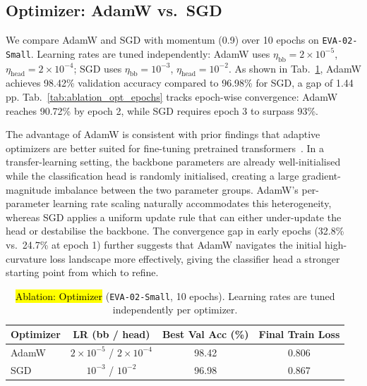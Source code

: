 \subsection{Optimizer: AdamW vs.\ SGD}

We compare AdamW and SGD with momentum (0.9) over 10 epochs on \texttt{EVA-02-Small}. Learning rates are tuned independently: AdamW uses $\eta_{\text{bb}}{=}2{\times}10^{-5}$, $\eta_{\text{head}}{=}2{\times}10^{-4}$; SGD uses $\eta_{\text{bb}}{=}10^{-3}$, $\eta_{\text{head}}{=}10^{-2}$. As shown in Tab.~\ref{tab:ablation_opt}, AdamW achieves 98.42\% validation accuracy compared to 96.98\% for SGD, a gap of 1.44\,pp. Tab.~\ref{tab:ablation_opt_epochs} tracks epoch-wise convergence: AdamW reaches 90.72\% by epoch 2, while SGD requires epoch 3 to surpass 93\%.

The advantage of AdamW is consistent with prior findings that adaptive optimizers are better suited for fine-tuning pretrained transformers~\citep{loshchilov2017decoupled}. In a transfer-learning setting, the backbone parameters are already well-initialised while the classification head is randomly initialised, creating a large gradient-magnitude imbalance between the two parameter groups. AdamW's per-parameter learning rate scaling naturally accommodates this heterogeneity, whereas SGD applies a uniform update rule that can either under-update the head or destabilise the backbone. The convergence gap in early epochs (32.8\% vs.\ 24.7\% at epoch 1) further suggests that AdamW navigates the initial high-curvature loss landscape more effectively, giving the classifier head a stronger starting point from which to refine.

\begin{table}[t]
\centering
\caption{\hl{Ablation: Optimizer} (\texttt{EVA-02-Small}, 10 epochs). Learning rates are tuned independently per optimizer.}
\label{tab:ablation_opt}
\footnotesize
\setlength{\tabcolsep}{4pt}
\begin{tabular}{lccc}
\toprule
Optimizer & LR (bb / head) & Best Val Acc (\%) & Final Train Loss \\
\midrule
AdamW & $2{\times}10^{-5}$ / $2{\times}10^{-4}$   & \cellcolor{blue!8}98.42 & 0.806 \\
SGD   & $10^{-3}$ / $10^{-2}$                       & 96.98 & 0.867 \\
\bottomrule
\end{tabular}
\end{table}

